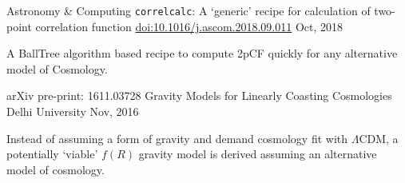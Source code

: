 

\begin{cventries}
	
		\cventry
		{Astronomy \& Computing} %
		{\texttt{correlcalc}: A `generic' recipe for calculation of two-point correlation function} %
		{\href{https://doi.org/10.1016/j.ascom.2018.09.011}{doi:10.1016/j.ascom.2018.09.011}} %
		{Oct, 2018} %
		{
			\begin{cvitems} %
				\item {A BallTree algorithm based recipe to compute 2pCF quickly for any alternative model of Cosmology.}
			\end{cvitems}		
		}
	
  \cventry
    {arXiv pre-print: 1611.03728} %
    {Gravity Models for Linearly Coasting Cosmologies} %
    {Delhi University} %
    {Nov, 2016} %
    {
      \begin{cvitems} %
        \item {Instead of assuming a form of gravity and demand cosmology fit with $\Lambda$CDM, a potentially `viable' $f(R)$ gravity model is derived assuming an alternative model of cosmology.}
      \end{cvitems}		
    }
   
\end{cventries}
